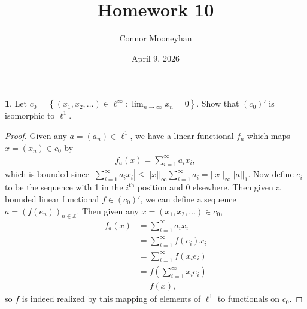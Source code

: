 \documentclass[12pt]{article}
\title{Homework 10}
\author{Connor Mooneyhan}
\date{April 9, 2026}
\theoremstyle{definition}
\newtheorem{ex}{}
\begin{document}
\maketitle

\begin{ex}
	Let $c_0 = \left\lbrace (x_1, x_2, \dots) \in \ell^\infty : \lim_{n \to \infty} x_n = 0 \right\rbrace$.
	Show that $(c_0)'$ is isomorphic to $\ell^1$.
\end{ex}
\begin{proof}
	Given any $a = (a_n) \in \ell^1$, we have a linear functional $f_a$ which maps $x = (x_n) \in c_0$ by \begin{align*}
		f_a(x)  = \sum_{i = 1}^\infty a_ix_i ,
	\end{align*}
	which is bounded since $\left| \sum_{i=1}^\infty a_ix_i \right| \leq ||x||_{\infty}\sum_{i=1}^\infty a_i = ||x||_\infty||a||_1$.
	Now define $e_i$ to be the sequence with 1 in the $i^{\text{th}}$ position and 0 elsewhere.
	Then given a bounded linear functional $f \in (c_0)'$, we can define a sequence $a = (f(e_n))_{n \in \mathbb{Z}}$.
	Then given any $x = (x_1, x_2, \dots) \in c_0$, \begin{align*}
		f_a(x) & = \sum_{i=1}^\infty a_ix_i               \\
		       & = \sum_{i=1}^\infty f(e_i)x_i            \\
		       & = \sum_{i=1}^\infty f(x_ie_i)            \\
		       & = f\left(\sum_{i=1}^\infty x_ie_i\right) \\
           & = f(x),
	\end{align*}
  so $f$ is indeed realized by this mapping of elements of $\ell^1$ to functionals on $c_0$.
\end{proof}
\end{document}
